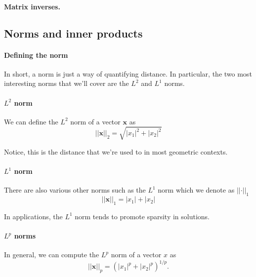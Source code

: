 \documentclass[12pt]{article}
\newcommand{\abs}[1]{ \left| #1 \right| }
\newcommand{\norm}[1]{ \left|\left| #1 \right|\right| }
\renewcommand{\vec}[1]{\mathbf{#1}}
\theoremstyle{definition}
\theoremstyle{remark}
\numberwithin{equation}{section}
\begin{document}
\paragraph{Matrix inverses.}

\subsection{Norms and inner products}%
\label{sub:norms}

\paragraph{Defining the norm}

In short, a norm is just a way of quantifying distance. In particular, the two most interesting norms that we'll cover are the $L^2$ and $L^1$ norms.

\paragraph{$L^2$ norm}%
\label{par:_l_2_norm}
We can define the $L^2$ norm of a vector $\vec{x}$ as 
\begin{equation}
  \norm{\vec{x}}_2 = \sqrt{\abs{x_1}^2 + \abs{x_2}^2}
\end{equation}

Notice, this is the distance that we're used to in most geometric contexts.

\paragraph{$L^1$ norm}%
\label{par:_l_1_norm}

There are also various other norms such as the $L^1$ norm which we denote as $\norm{\cdot}_1$
\begin{equation}
  \norm{\vec{x}}_1 = \abs{x_1} + \abs{x_2}
\end{equation}

In applications, the $L^1$ norm tends to promote sparsity in solutions.

\paragraph{$L^p$ norms}%
\label{par:other_norms} 

In general, we can compute the $L^p$ norm of a vector $x$ as 
\begin{equation}
  \norm{\vec{x}}_p = (\abs{x_1}^p + \abs{x_2}^p)^{1/p}.
\end{equation}
\end{document}
